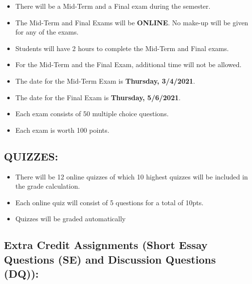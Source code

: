\documentclass[11pt,]{article}
\providecommand{\tightlist}{%
  \setlength{\itemsep}{0pt}\setlength{\parskip}{0pt}}
\begin{document}
\begin{itemize}
\tightlist
\item
  There will be a Mid-Term and a Final exam during the semester.
\item
  The Mid-Term and Final Exams will be \textbf{ONLINE}. No make-up will be given for any of
  the exams.
\item
  Students will have 2 hours to complete the Mid-Term and Final exams.
\item
  For the Mid-Term and the Final Exam, additional time will not be allowed.
\item
  The date for the Mid-Term Exam is \textbf{Thursday, 3/4/2021}.
\item
  The date for the Final Exam is \textbf{Thursday, 5/6/2021}.
\item
  Each exam consists of 50 multiple choice questions.
\item
  Each exam is worth 100 points.
\end{itemize}

\hypertarget{quizzes}{%
\subsection{QUIZZES:}\label{quizzes}}

\begin{itemize}
\tightlist
\item
  There will be 12 online quizzes of which 10 highest quizzes will be included in the grade
  calculation.
\item
  Each online quiz will consist of 5 questions for a total of 10pts.
\item
  Quizzes will be graded automatically
\end{itemize}

\hypertarget{extra-credit-assignments-short-essay-questions-se-and-discussion-questions-dq}{%
\subsection{Extra Credit Assignments (Short Essay Questions (SE) and Discussion Questions (DQ)):}\label{extra-credit-assignments-short-essay-questions-se-and-discussion-questions-dq}}
\end{document}
